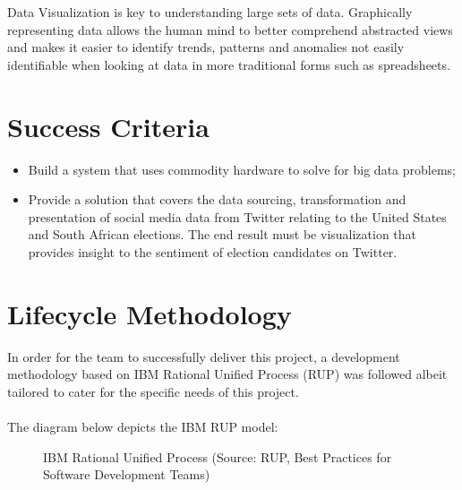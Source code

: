 \documentclass[12pt]{article} %
\begin{document}
	Data Visualization is key to understanding large sets of data. Graphically representing  data allows the human mind to better comprehend abstracted views and makes it easier to identify trends, patterns and anomalies not easily identifiable when looking at data in more traditional forms such as spreadsheets.
		
	
		\section{Success Criteria} %
		
		\begin{itemize}
			\item Build a system that uses commodity hardware to solve for big data problems;
			\item Provide a solution that covers the data sourcing, transformation and presentation of social media data from Twitter relating to the United States and South African elections. The end result must be visualization that provides insight to the sentiment of election candidates on Twitter.
		\end{itemize}
		

	
	\section{Lifecycle Methodology}
	
	
	In order for the team to successfully deliver this project, a development methodology based on IBM Rational Unified Process (RUP) was followed albeit tailored to cater for the specific needs of this project.\\
	\\
	The diagram below depicts the IBM RUP model:
	
		\begin{figure}[H] %
			\caption{IBM Rational Unified Process (Source: RUP, Best Practices for Software Development Teams)}
			\label{fig:speciation}
		\end{figure}
		
\end{document}

